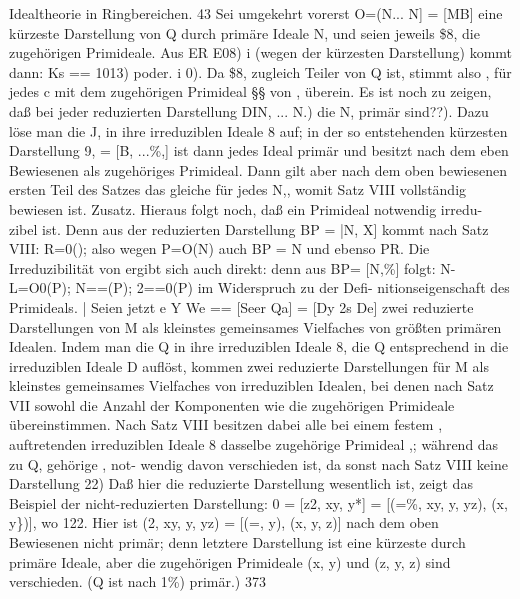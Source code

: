 \documentclass[11pt,a4paper]{article}
\theoremstyle{plain}
\theoremstyle{definition}
\begin{document}
Idealtheorie in Ringbereichen. 
43 
Sei umgekehrt vorerst 
O=(N... N] = [MB] 
eine kürzeste Darstellung von Q durch primäre Ideale N, und seien jeweils 
\$8, die zugehörigen Primideale. 
Aus 
ER 
E08) 
i 
(wegen der kürzesten Darstellung) kommt dann: 
Ks 
== 1013) 
poder. i 0). 
Da \$8, zugleich Teiler von Q ist, stimmt also , für jedes c mit dem 
zugehörigen Primideal \S{}\S{} von , überein. 
Es 
ist noch 
zu 
zeigen, 
daß 
bei 
jeder 
reduzierten 
Darstellung 
DIN, ... N.) die N, primär sind??). 
Dazu löse man die J, in ihre 
irreduziblen Ideale 8 auf; in der so entstehenden kürzesten Darstellung 
9, = [B, ...\%,] ist dann jedes Ideal primär und besitzt nach dem eben 
Bewiesenen  als zugehöriges Primideal. 
Dann gilt aber nach dem oben 
bewiesenen ersten Teil des Satzes das gleiche für jedes N,, womit Satz VIII 
vollständig bewiesen ist. 
Zusatz. 
Hieraus folgt noch, daß ein Primideal notwendig irredu- 
zibel ist. Denn aus der reduzierten Darstellung 
BP = |N, X] kommt nach 
Satz VIII: R=0(); also wegen 
P=O(N) auch BP = N und ebenso 
PR. 
Die Irreduzibilität von  ergibt sich auch direkt: denn aus BP= [N,\%] 
folgt: N-L=O0(P); N==(P); 2==0(P) im Widerspruch zu der Defi- 
nitionseigenschaft des Primideals. 
| 
Seien jetzt 
e 
Y 
We == [Seer 
Qa] = [Dy 2s 
De] 
zwei reduzierte Darstellungen von M als kleinstes gemeinsames Vielfaches 
von 
größten primären Idealen. 
Indem man die Q in ihre irreduziblen 
Ideale 8, die Q entsprechend in die irreduziblen Ideale D auflöst, kommen 
zwei reduzierte Darstellungen für M als kleinstes gemeinsames Vielfaches 
von irreduziblen Idealen, bei denen nach Satz VII sowohl die Anzahl der 
Komponenten wie die zugehörigen Primideale übereinstimmen. Nach Satz VIII 
besitzen dabei alle bei einem festem , auftretenden irreduziblen Ideale 8 
dasselbe zugehörige Primideal ,; während das zu Q, gehörige , not- 
wendig davon verschieden ist, da sonst nach Satz VIII keine Darstellung 
22) Daß hier die reduzierte Darstellung wesentlich 
ist, zeigt das Beispiel der 
nicht-reduzierten Darstellung: 
0 = [z2, xy, y*] = [(=\%, xy, y, yz), (x, y\})], wo 122. 
Hier 
ist (2\textdegree{}, xy, y, yz) = [(=\textdegree{}, y), (x, y, z)] nach dem oben Bewiesenen 
nicht 
primär; denn letztere Darstellung ist eine kürzeste durch primäre Ideale, 
aber die 
zugehörigen Primideale (x, y) und (z, y, z) sind verschieden. 
(Q ist nach 1\%) primär.) 
373
\end{document}
